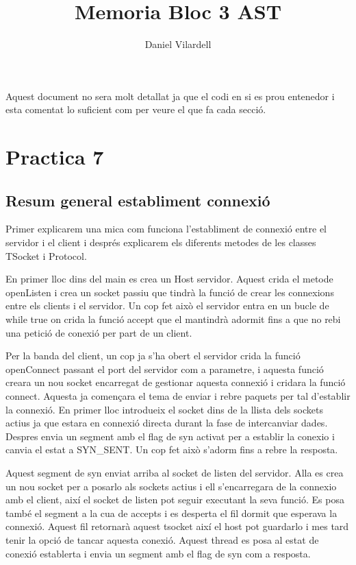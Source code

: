 \documentclass[12pt, a4papre]{article}
\author{Daniel Vilardell}
\title{Memoria Bloc 3 AST}
\date{}
\begin{document}
	\maketitle
	\tableofcontents
	\vspace{10mm}
	\begin{center}
		Aquest document no sera molt detallat ja que el codi en si es prou entenedor i esta comentat lo suficient com per veure el que fa cada secció.
	\end{center}
	\newpage
	\section{Practica 7}
	
	\subsection{Resum general establiment connexió}
	
	Primer explicarem una mica com funciona l'establiment de connexió entre el servidor i el client i després explicarem els diferents metodes de les classes TSocket i Protocol.
	
	En primer lloc dins del main es crea un Host servidor. Aquest crida el metode openListen i crea un socket passiu que tindrà la funció de crear les connexions entre els clients i el servidor. Un cop fet això el servidor entra en un bucle de while true on crida la funció accept que el mantindrà adormit fins a que no rebi una petició de conexió per part de un client.
	
	Per la banda del client, un cop ja s'ha obert el servidor crida la funció openConnect passant el port del servidor com a parametre, i aquesta funció creara un nou socket encarregat de gestionar aquesta connexió i cridara la funció connect. Aquesta ja començara el tema de enviar i rebre paquets per tal d'establir la connexió. En primer lloc introdueix el socket dins de la llista dels sockets actius ja que estara en connexió directa durant la fase de intercanviar dades. Despres envia un segment amb el flag de syn activat per a establir la conexio i canvia el estat a SYN\_SENT. Un cop fet això s'adorm fins a rebre la resposta. 
	
	Aquest segment de syn enviat arriba al socket de listen del servidor. Alla es crea un nou socket per a posarlo als sockets actius i ell s'encarregara de la connexio amb el client, així el socket de listen pot seguir executant la seva funció. Es posa també el segment a la cua de accepts i es desperta el fil dormit que esperava la connexió. Aquest fil retornarà aquest tsocket així el host  pot guardarlo i mes tard tenir la opció de tancar aquesta conexió. Aquest thread es posa al estat de conexió establerta i envia un segment amb el flag de syn com a resposta.
	
\end{document}
